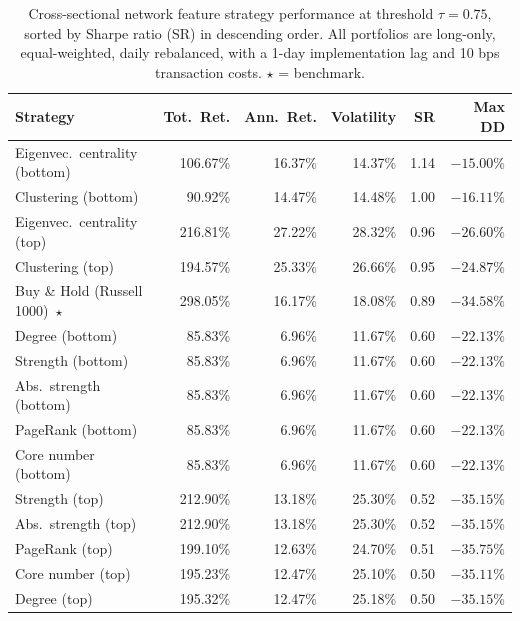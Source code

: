 \documentclass{article}
\begin{document}
\begin{table}[H]
\centering
\small
\caption{Cross-sectional network feature strategy performance at threshold $\tau = 0.75$, sorted by Sharpe ratio (SR) in descending order. All portfolios are long-only, equal-weighted, daily rebalanced, with a 1-day implementation lag and 10 bps transaction costs. $\star$ = benchmark.}
\label{tab:cs_summary}
\begin{tabular}{lrrrrr}
\toprule
\textbf{Strategy} & \textbf{Tot.\ Ret.} & \textbf{Ann.\ Ret.} & \textbf{Volatility} & \textbf{SR} & \textbf{Max DD} \\
\midrule
Eigenvec.\ centrality (bottom)      & 106.67\% &  16.37\% &  14.37\% & 1.14 & $-15.00\%$ \\
Clustering (bottom)                 &  90.92\% &  14.47\% &  14.48\% & 1.00 & $-16.11\%$ \\
Eigenvec.\ centrality (top)         & 216.81\% &  27.22\% &  28.32\% & 0.96 & $-26.60\%$ \\
Clustering (top)                    & 194.57\% &  25.33\% &  26.66\% & 0.95 & $-24.87\%$ \\
Buy \& Hold (Russell 1000)~$\star$  & 298.05\% &  16.17\% &  18.08\% & 0.89 & $-34.58\%$ \\
Degree (bottom)                     &  85.83\% &   6.96\% &  11.67\% & 0.60 & $-22.13\%$ \\
Strength (bottom)                   &  85.83\% &   6.96\% &  11.67\% & 0.60 & $-22.13\%$ \\
Abs.\ strength (bottom)             &  85.83\% &   6.96\% &  11.67\% & 0.60 & $-22.13\%$ \\
PageRank (bottom)                   &  85.83\% &   6.96\% &  11.67\% & 0.60 & $-22.13\%$ \\
Core number (bottom)                &  85.83\% &   6.96\% &  11.67\% & 0.60 & $-22.13\%$ \\
Strength (top)                      & 212.90\% &  13.18\% &  25.30\% & 0.52 & $-35.15\%$ \\
Abs.\ strength (top)                & 212.90\% &  13.18\% &  25.30\% & 0.52 & $-35.15\%$ \\
PageRank (top)                      & 199.10\% &  12.63\% &  24.70\% & 0.51 & $-35.75\%$ \\
Core number (top)                   & 195.23\% &  12.47\% &  25.10\% & 0.50 & $-35.11\%$ \\
Degree (top)                        & 195.32\% &  12.47\% &  25.18\% & 0.50 & $-35.15\%$ \\
\bottomrule
\end{tabular}
\end{table}
\end{document}
